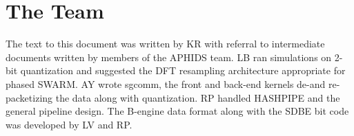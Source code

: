 \documentclass[11pt,preprint]{aastex}
\begin{document}

\section{The Team}
The text to this document was written by KR with referral to intermediate documents written by
members of the APHIDS team.  LB ran simulations on 2-bit quantization and suggested the DFT resampling 
architecture appropriate for phased SWARM. AY wrote sgcomm, the front and back-end kernels de-and re-packetizing 
the data along with quantization. RP handled HASHPIPE and the general pipeline design.  The B-engine data format 
along with the SDBE bit code was developed by LV and RP.

\acknowledgments 
\clearpage


\end{document}
